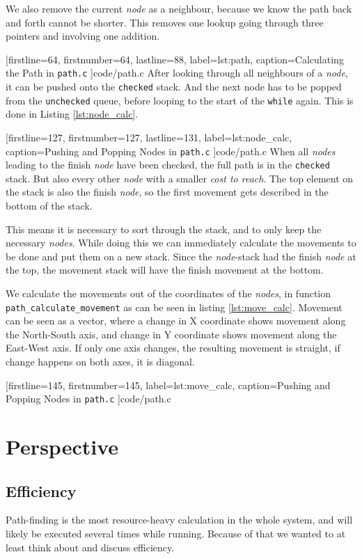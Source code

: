 We also remove the current \emph{node} as a neighbour,
because we know the path back and forth cannot be shorter.
This removes one lookup going through three pointers and involving one addition.


[firstline=64,			%
firstnumber=64,
lastline=88,			%
label=lst:path,	%
caption={Calculating the Path in {\tt path.c}}
]{code/path.c}
%
After looking through all neighbours of a \emph{node},
it can be pushed onto the {\tt checked} stack.
And the next node has to be popped from the {\tt unchecked} queue,
before looping to the start of the {\tt while} again.
This is done in Listing \ref{lst:node_calc}.


[firstline=127,			%
firstnumber=127,
lastline=131,			%
label=lst:node_calc,	%
caption={Pushing and Popping Nodes in {\tt path.c}}
]{code/path.c}
%
When all \emph{nodes} leading to the finish \emph{node} have been checked,
the full path is in the {\tt checked} stack.
But also every other \emph{node} with a smaller \emph{cost to reach}.
The top element on the stack is also the finish \emph{node},
so the first movement gets described in the bottom of the stack.

This means it is necessary to sort through the stack,
and to only keep the necessary \emph{nodes}.
While doing this we can immediately calculate the movements to be done
and put them on a new stack.
Since the \emph{node}-stack had the finish \emph{node} at the top,
the movement stack will have the finish movement at the bottom.

We calculate the movements out of the coordinates of the \emph{nodes},
in function {\tt path\_calculate\_movement} as can be seen in listing \ref{lst:move_calc}.
Movement can be seen as a vector,
where a change in X coordinate shows movement along the North-South axis,
and change in Y coordinate shows movement along the East-West axis.
If only one axis changes, the resulting movement is straight,
if change happens on both axes, it is diagonal.


[firstline=145,			%
firstnumber=145,
label=lst:move_calc,	%
caption={Pushing and Popping Nodes in {\tt path.c}}
]{code/path.c}
%
\section{Perspective}
\subsection{Efficiency}
Path-finding is the most resource-heavy calculation in the whole system,
and will likely be executed several times while running.
Because of that we wanted to at least think about and discuss efficiency.

